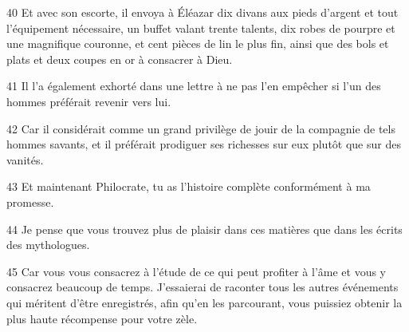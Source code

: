 \par 40 Et avec son escorte, il envoya à Éléazar dix divans aux pieds d'argent et tout l'équipement nécessaire, un buffet valant trente talents, dix robes de pourpre et une magnifique couronne, et cent pièces de lin le plus fin, ainsi que des bols et plats et deux coupes en or à consacrer à Dieu.

\par 41 Il l'a également exhorté dans une lettre à ne pas l'en empêcher si l'un des hommes préférait revenir vers lui.

\par 42 Car il considérait comme un grand privilège de jouir de la compagnie de tels hommes savants, et il préférait prodiguer ses richesses sur eux plutôt que sur des vanités.

\par 43 Et maintenant Philocrate, tu as l'histoire complète conformément à ma promesse.

\par 44 Je pense que vous trouvez plus de plaisir dans ces matières que dans les écrits des mythologues.

\par 45 Car vous vous consacrez à l'étude de ce qui peut profiter à l'âme et vous y consacrez beaucoup de temps. J'essaierai de raconter tous les autres événements qui méritent d'être enregistrés, afin qu'en les parcourant, vous puissiez obtenir la plus haute récompense pour votre zèle.


